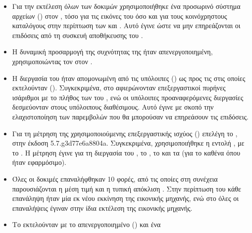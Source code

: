 \begin{itemize}
    \item Για την εκτέλεση όλων των δοκιμών χρησιμοποιήθηκε ένα προσωρινό
          σύστημα αρχείων () %
          στον \host{}, τόσο για τις εικόνες του \osv{} όσο και για τους
          κοινόχρηστους καταλόγους στην περίπτωση των \viofs{} και .
          Αυτό έγινε ώστε να μην επηρεάζονται οι επιδόσεις από τη συσκευή
          αποθήκευσης του \host{}.
    \item Η δυναμική προσαρμογή της συχνότητας της  ήταν
          απενεργοποιημένη, χρησιμοποιώντας τον  %
          στον \host{}.
    \item Η διεργασία του \qemu{} ήταν απομονωμένη από τις υπόλοιπες
          () ως προς τις  στις οποίες
          εκτελούνταν (). %
          Συγκεκριμένα, στο \qemu{} αφιερώνονταν επεξεργαστικοί πυρήνες
          ισάριθμοι με το πλήθος των  του \guest{}, ενώ οι υπόλοιπες
          προαναφερόμενες διεργασίες δεσμεύονταν στους υπόλοιπους διαθέσιμους.
          Αυτό έγινε με σκοπό την ελαχιστοποίηση των παρεμβολών που θα μπορούσαν
          να επηρεάσουν τις επιδόσεις.
    \item Για τη μέτρηση της χρησιμοποιούμενης επεξεργαστικής ισχύος () επελέγη το  \cite{perf}, στην έκδοση
          5.7.g3d77e6a8804a. Συγκεκριμένα, χρησιμοποιήθηκε η εντολή
          \texttt{}, με το . Η
          μέτρηση έγινε για τη διεργασία του \qemu{}, το , το
           \cite{stfanha:vhost} και τα  (για το καθένα όπου ήταν εφαρμόσιμο).
    \item Όλες οι δοκιμές επαναλήφθηκαν 10 φορές, από τις οποίες στη συνέχεια
          παρουσιάζονται η μέση τιμή  και η τυπική απόκλιση
          . Στην περίπτωση του \osv{} κάθε επανάληψη ήταν
          μία εκ νέου εκκίνηση της εικονικής μηχανής, ενώ στο \linux{} όλες οι
          επαναλήψεις έγιναν στην ίδια εκτέλεση της εικονικής μηχανής.
    \item Το  εκτελούνταν με το  απενεργοποιημένο
          (\texttt{}) και ένα 

\end{itemize}
